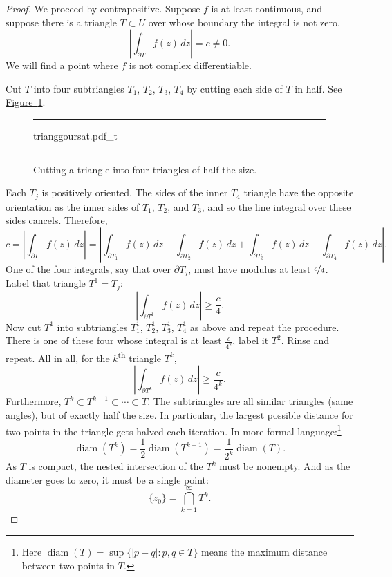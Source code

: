 \documentclass[12pt,openany]{book}
\newcommand{\sabs}[1]{\lvert {#1} \rvert}
\newcommand{\abs}[1]{\left\lvert {#1} \right\rvert}
\theoremstyle{plain}
\theoremstyle{remark}
\theoremstyle{definition}
\newenvironment{myfig}{%
\begin{figure}[h!t]
\noindent\rule{\textwidth}{0.5pt}\vspace{12pt}\par\centering}%
{\par\noindent\rule{\textwidth}{0.5pt}
\end{figure}}
\theoremstyle{exercise}
\theoremstyle{example}
\newcommand{\figureref}[1]{\hyperref[#1]{Figure~\ref*{#1}}}
\begin{document}
\begin{proof}
We proceed by contrapositive.
Suppose $f$ is at least continuous, and 
suppose there is a triangle $T \subset U$ over whose boundary the integral is not zero,
\begin{equation*}
\abs{\int_{\partial T} f(z) \, dz} = c \not= 0 .
\end{equation*}
We will find a point
where $f$ is not complex differentiable.

Cut $T$ into four subtriangles
$T_1$, $T_2$, $T_3$, $T_4$ by cutting each side of $T$ in half.  See
\figureref{fig:trianggoursat}.
\begin{myfig}
{trianggoursat.pdf_t}
\caption{Cutting a triangle into four triangles of half the size.%
\label{fig:trianggoursat}}
\end{myfig}

Each $T_j$ is positively oriented.
The sides of the inner $T_4$ triangle have the opposite
orientation as the inner sides of $T_1$, $T_2$, and $T_3$, and
so the line integral over these sides cancels.  Therefore,
\begin{equation*}
c = 
\abs{\int_{\partial T} f(z) \, dz }
=
\abs{\int_{\partial T_1} f(z) \, dz 
+
\int_{\partial T_2} f(z) \, dz 
+
\int_{\partial T_3} f(z) \, dz 
+
\int_{\partial T_4} f(z) \, dz } .
\end{equation*}
One of the four integrals, say that over $\partial T_j$,
must have modulus at least $\nicefrac{c}{4}$.  Label
that triangle $T^1 = T_j$:
\begin{equation*}
\abs{\int_{\partial T^1} f(z) \, dz } \geq \frac{c}{4} .
\end{equation*}
Now cut $T^1$ into subtriangles
$T_1^1$, $T_2^1$, $T_3^1$, $T_4^1$ as above and repeat the procedure.  There
is one of these four whose integral is at least $\frac{c}{4^2}$, label it
$T^2$.  Rinse and repeat.
All in all, for the $k$\textsuperscript{th} triangle $T^k$,
\begin{equation*}
\abs{\int_{\partial T^k} f(z) \, dz } \geq \frac{c}{4^k} .
\end{equation*}
Furthermore, $T^k \subset T^{k-1} \subset \cdots \subset T$.
The subtriangles are all similar triangles (same angles),
but of exactly half the size.
In particular,
the largest possible distance for two points in the triangle 
gets halved each iteration.
In more formal language:\footnote{%
Here $\operatorname{diam}(T)= \sup \{ \sabs{p-q} : p,q \in T \}$
means the maximum distance between two points in $T$.}
\begin{equation*}
\operatorname{diam}(T^k) =
\frac{1}{2} \operatorname{diam}(T^{k-1})
=
\frac{1}{2^k} \operatorname{diam}(T) .
\end{equation*}
As $T$ is compact, the nested intersection of the $T^k$ must be nonempty.
And as the diameter goes to zero, it must be a single point:
\begin{equation*}
\{ z_0 \} = \bigcap_{k=1}^\infty T^k .
\end{equation*}


\end{proof}
\end{document}
